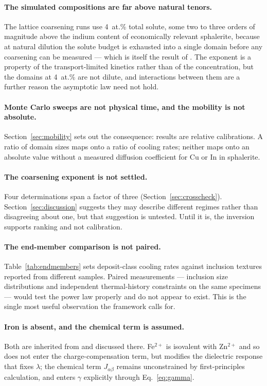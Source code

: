 \documentclass[11pt,a4paper]{article}
\begin{document}
\paragraph{The simulated compositions are far above natural tenors.} The lattice
coarsening runs use 4~at.\% total solute, some two to three orders of magnitude
above the indium content of economically relevant sphalerite, because at natural
dilution the solute budget is exhausted into a single domain before any
coarsening can be measured --- which is itself the result of \citet{yu2026b}.
The exponent is a property of the transport-limited kinetics rather than of the
concentration, but the domains at 4~at.\% are not dilute, and interactions
between them are a further reason the asymptotic law need not hold.

\paragraph{Monte Carlo sweeps are not physical time, and the mobility is not
absolute.} Section~\ref{sec:mobility} sets out the consequence: results are
relative calibrations. A ratio of domain sizes maps onto a ratio of cooling
rates; neither maps onto an absolute value without a measured diffusion
coefficient for Cu or In in sphalerite.

\paragraph{The coarsening exponent is not settled.} Four determinations span a
factor of three (Section~\ref{sec:crosscheck}). Section~\ref{sec:discussion}
suggests they may describe different regimes rather than disagreeing about one,
but that suggestion is untested. Until it is, the inversion supports ranking
and not calibration.

\paragraph{The end-member comparison is not paired.} Table~\ref{tab:endmembers}
sets deposit-class cooling rates against inclusion textures reported from
different samples. Paired measurements --- inclusion size distributions and
independent thermal-history constraints on the same specimens --- would test the
power law properly and do not appear to exist. This is the single most useful
observation the framework calls for.

\paragraph{Iron is absent, and the chemical term is assumed.} Both are inherited
from \citet{yu2026} and discussed there. Fe$^{2+}$ is isovalent with
Zn$^{2+}$ and so does not enter the charge-compensation term, but modifies the
dielectric response that fixes $\lambda$; the chemical term $J_{\alpha\beta}$
remains unconstrained by first-principles calculation, and enters $\gamma$
explicitly through Eq.~\eqref{eq:gamma}.
\end{document}
